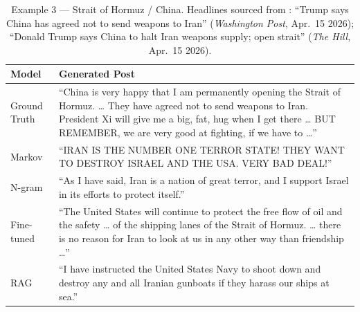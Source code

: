 \documentclass[11pt,a4paper]{article}
\begin{document}
\begin{table}[H]
\centering
\caption{Example 3 --- Strait of Hormuz / China. Headlines sourced from \citet{wapo2026chinairan,thehill2026hormuz}: ``Trump says China has agreed not to send weapons to Iran'' (\textit{Washington Post}, Apr.\ 15 2026); ``Donald Trump says China to halt Iran weapons supply; open strait'' (\textit{The Hill}, Apr.\ 15 2026).}
\label{tab:qual3}
\begin{tabular}{lp{9.5cm}}
\toprule
\textbf{Model} & \textbf{Generated Post} \\
\midrule
Ground Truth  & ``China is very happy that I am permanently opening the Strait of Hormuz. \ldots{} They have agreed not to send weapons to Iran. President Xi will give me a big, fat, hug when I get there \ldots{} BUT REMEMBER, we are very good at fighting, if we have to \ldots'' \\
\midrule
Markov        & ``IRAN IS THE NUMBER ONE TERROR STATE! THEY WANT TO DESTROY ISRAEL AND THE USA. VERY BAD DEAL!'' \\
N-gram        & ``As I have said, Iran is a nation of great terror, and I support Israel in its efforts to protect itself.'' \\
Fine-tuned    & ``The United States will continue to protect the free flow of oil and the safety \ldots{} of the shipping lanes of the Strait of Hormuz. \ldots{} there is no reason for Iran to look at us in any other way than friendship \ldots'' \\
RAG           & ``I have instructed the United States Navy to shoot down and destroy any and all Iranian gunboats if they harass our ships at sea.'' \\
\bottomrule
\end{tabular}
\end{table}
\end{document}
